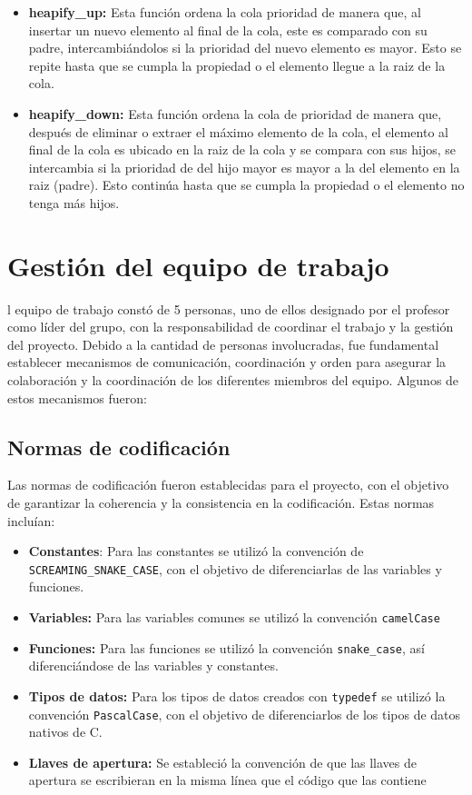 \documentclass[9pt,letterpaper,onecolumn]{rho-class/rho}
\begin{document}
    \begin{itemize}
        \item \textbf{heapify\_up:} Esta función ordena la cola prioridad de manera que, al insertar un nuevo elemento al final de la cola, este es comparado con su padre, intercambiándolos si la prioridad del nuevo elemento es mayor. Esto se repite hasta que se cumpla la propiedad o el elemento llegue a la raiz de la cola.
        \item \textbf{heapify\_down:} Esta función ordena la cola de prioridad de manera que, después de eliminar o extraer el máximo elemento de la cola, el elemento al final de la cola es ubicado en la raiz de la cola y se compara con sus hijos, se intercambia si la prioridad de del hijo mayor es mayor a la del elemento en la raiz (padre). Esto continúa hasta que se cumpla la propiedad o el elemento no tenga más hijos.
    \end{itemize}

\newpage
\section{Gestión del equipo de trabajo}

    l equipo de trabajo constó de 5 personas, uno de ellos designado por el profesor como líder del grupo, con la responsabilidad de coordinar el trabajo y la gestión del proyecto. Debido a la cantidad de personas involucradas, fue fundamental establecer mecanismos de comunicación, coordinación y orden para asegurar la colaboración y la coordinación de los diferentes miembros del equipo. Algunos de estos mecanismos fueron:

    \subsection{Normas de codificación}

        Las normas de codificación fueron establecidas para el proyecto, con el objetivo de garantizar la coherencia y la consistencia en la codificación. Estas normas incluían:

        \begin{itemize}
            \item \textbf{Constantes}: Para las constantes se utilizó la convención de \texttt{SCREAMING\_SNAKE\_CASE}, con el objetivo de diferenciarlas de las variables y funciones.
            \item \textbf{Variables:} Para las variables comunes se utilizó la convención \texttt{camelCase}
            \item \textbf{Funciones:} Para las funciones se utilizó la convención \texttt{snake\_case}, así diferenciándose de las variables y constantes.
            \item \textbf{Tipos de datos:} Para los tipos de datos creados con \texttt{typedef} se utilizó la convención \texttt{PascalCase}, con el objetivo de diferenciarlos de los tipos de datos nativos de C.
            \item \textbf{Llaves de apertura:} Se estableció la convención de que las llaves de apertura se escribieran en la misma línea que el código que las contiene
        \end{itemize}
\end{document}
